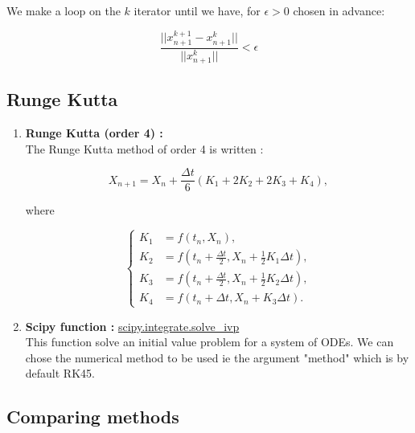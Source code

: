 \documentclass[12pt]{article}
\begin{document}
	\noindent We make a loop on the $k$ iterator until we have, for $\epsilon>0$ chosen in advance:
	
	$$\frac{||x_{n+1}^{k+1}-x_{n+1}^k||}{||x_{n+1}^k||}<\epsilon$$
	
	\subsection{Runge Kutta}
	\label{sec4.4}
	
	\begin{enumerate}[label=\textbullet]
		\item \textbf{Runge Kutta (order 4) :} \\
		The Runge Kutta method of order 4 is written :
		
		$$X_{n+1}=X_n+\frac{\Delta t}{6}\left(K_1+2K_2+2K_3+K_4\right) ,$$
		
		\noindent where 
		
		$$\left\{\begin{aligned}
			K_1&=f(t_n,X_n) , \\
			K_2&=f\left(t_n+\frac{\Delta t}{2},X_n+\frac{1}{2} K_1\Delta t\right) , \\
			K_3&=f\left(t_n+\frac{\Delta t}{2},X_n+\frac{1}{2} K_2\Delta t\right) , \\
			K_4&=f\left(t_n+\Delta t,X_n+K_3\Delta t\right) .
		\end{aligned}\right.$$
		\item \textbf{Scipy function :} \href{https://docs.scipy.org/doc/scipy/reference/generated/scipy.integrate.solve_ivp.html#scipy.integrate.solve_ivp}{scipy.integrate.solve\_ivp} \\
		This function solve an initial value problem for a system of ODEs. We can chose the numerical method to be used ie the argument "method" which is by default RK45. 
	\end{enumerate}
	
	\subsection{Comparing methods}
	
\end{document}
